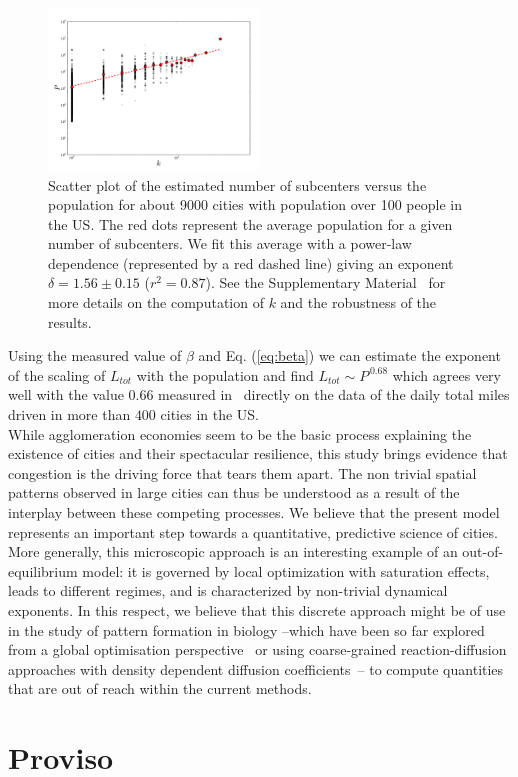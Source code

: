\begin{figure}
\includegraphics[width=0.5\textwidth]{gfx/chapter-monocentric/5.pdf}
\caption{Scatter plot of the estimated number of subcenters versus the
  population for about 9000 cities with population over 100 people in
  the US. The red dots represent the average population for a given
  number of subcenters. We fit this average with a power-law
  dependence (represented by a red dashed line) giving an exponent
  $\delta=1.56\pm 0.15$ ($r^2=0.87$). See the Supplementary Material~\cite{SM} for more details on the computation of $k$ and the robustness of the results. \label{fig:data}}
\end{figure}

Using the measured value of $\beta$ and Eq. (\ref{eq:beta}) we can estimate the exponent of
the scaling of $L_{tot}$ with the population and find $L_{tot} \sim
P^{\,0.68}$ which agrees very well with the value $0.66$ measured
in~\cite{Samaniego:2008} directly on the data of the daily total miles
driven in more than $400$ cities in the US.\\

While agglomeration economies seem to be the basic process explaining
the existence of cities and their spectacular resilience, this study
brings evidence that congestion is the driving force that tears them
apart. The non trivial spatial patterns observed in large cities can
thus be understood as a result of the interplay between these
competing processes. We believe that the present model represents an
important step towards a quantitative, predictive science of
cities. More generally, this microscopic approach is an interesting
example of an out-of-equilibrium model: it is governed by local
optimization with saturation effects, leads to different regimes, and
is characterized by non-trivial dynamical exponents. In this respect,
we believe that this discrete approach might be of use in the study of
pattern formation in biology --which have been so far explored from a
global optimisation perspective~\cite{Ashton:2005} or using
coarse-grained reaction-diffusion approaches with density dependent
diffusion coefficients~\cite{Cates:2012}-- to compute quantities that
are out of reach within the current methods.
\section{Proviso}
\label{sec:proviso}


